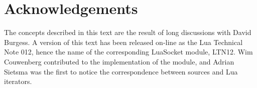 \documentclass[10pt]{article}
\begin{document}
\section{Acknowledgements}

The concepts described in this text are the result of  long
discussions with David Burgess. A version of this text has
been released on-line as the Lua Technical Note 012, hence
the name of the corresponding LuaSocket module, LTN12.  Wim
Couwenberg contributed to the implementation of the module,
and Adrian Sietsma was the first to notice the
correspondence between sources and Lua iterators.
\end{document}
